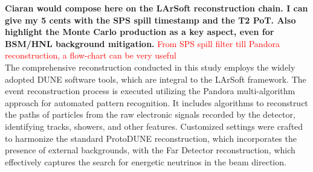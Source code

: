 \textbf{Ciaran would compose here on the LArSoft reconstruction chain. I can give my 5 cents with the SPS spill timestamp and the T2 PoT. Also highlight the Monte Carlo production as a key aspect, even for BSM/HNL background mitigation.} \newline
\textcolor{red}{From SPS spill filter till Pandora reconstruction, a flow-chart can be very useful}\\
The comprehensive reconstruction conducted in this study employs the widely adopted DUNE software tools, which are integral to the LArSoft framework. The event reconstruction process is executed utilizing the Pandora multi-algorithm approach for automated pattern recognition. It includes algorithms to reconstruct the paths of particles from the raw electronic signals recorded by the detector, identifying tracks, showers, and other features. Customized settings were crafted to harmonize the standard ProtoDUNE reconstruction, which incorporates the presence of external backgrounds, with the Far Detector reconstruction, which effectively captures the search for energetic neutrinos in the beam direction.
\label{sec:reco}